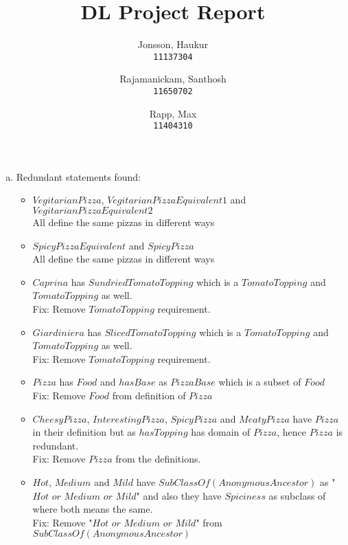 \documentclass{article}
\begin{document}
\author{
  Jonsson, Haukur\\
  \texttt{11137304}
  \and
  Rajamanickam, Santhosh\\
  \texttt{11650702}
  \and
  Rapp, Max\\
  \texttt{11404310}
}
\title{DL Project Report}
\maketitle

\begin{enumerate}[(a)]
\item Redundant statements found:

\begin{itemize}
\item $VegitarianPizza$, $VegitarianPizzaEquivalent1$ and $VegitarianPizzaEquivalent2$ \\
All define the same pizzas in different ways

\item $SpicyPizzaEquivalent$ and $SpicyPizza$ \\
All define the same pizzas in different ways

\item $Caprina$ has $SundriedTomatoTopping$ which is a $TomatoTopping$ and $TomatoTopping$ as well. \\
Fix: Remove $TomatoTopping$ requirement.

\item $Giardiniera$ has $SlicedTomatoTopping$ which is a $TomatoTopping$ and $TomatoTopping$ as well. \\
Fix: Remove $TomatoTopping$ requirement.

\item $Pizza$ has $Food$ and $hasBase$ as $PizzaBase$ which is a subset of $Food$ \\
Fix: Remove $Food$ from definition of $Pizza$

\item $CheesyPizza$, $InterestingPizza$, $SpicyPizza$ and $Meaty Pizza$ have $Pizza$ in their definition but as $hasTopping$ has domain of $Pizza$, hence $Pizza$ is redundant. \\ 
Fix: Remove $Pizza$ from the definitions.

\item  $Hot$, $Medium$ and $Mild$ have $SubClass Of(Anonymous Ancestor)$ as "$Hot$ $or$ $Medium$ $or$ $Mild$" and also they have $Spiciness$ as subclass of where both means the same. \\
Fix: Remove "$Hot$ $or$ $Medium$ $or$ $Mild$" from $SubClass Of(Anonymous Ancestor)$ 


\end{itemize}
\end{enumerate}
\end{document}
